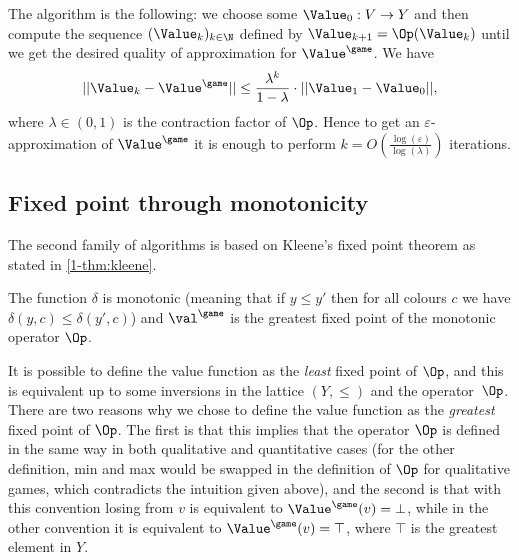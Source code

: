 The algorithm is the following:
we choose some $\Value_0 : V \to Y$ and then compute the sequence $(\Value_k)_{k \in \N}$ defined by $\Value_{k+1} = \Op(\Value_k)$
until we get the desired quality of approximation for $\Value^{\game}$.
We have
\[
||\Value_k - \Value^{\game}|| \le \frac{\lambda^k}{1 - \lambda} \cdot ||\Value_1 - \Value_0||,
\]
where $\lambda \in (0,1)$ is the contraction factor of $\Op$.
Hence to get an $\varepsilon$-approximation of $\Value^{\game}$ it is enough to perform 
$k = O \left( \frac{\log(\varepsilon)}{\log(\lambda)} \right)$ iterations.

\subsection*{Fixed point through monotonicity}
The second family of algorithms is based on Kleene's fixed point theorem as stated in \cref{1-thm:kleene}.

\begin{property}
\label{1-property:fixed_point_monotonicity}
The function $\delta$ is monotonic (meaning that if $y \le y'$ then for all colours $c$ we have $\delta(y,c) \le \delta(y',c)$)
and $\val^{\game}$ is the greatest fixed point of the monotonic operator $\Op$.
\end{property}

\begin{remark}
It is possible to define the value function as the \textit{least} fixed point of $\Op$, 
and this is equivalent up to some inversions in the lattice $(Y,\le)$ and the operator~$\Op$.
There are two reasons why we chose to define the value function as the \textit{greatest} fixed point of $\Op$.
The first is that this implies that the operator $\Op$ is defined in the same way in both qualitative and quantitative cases (for the other definition, min and max would be swapped in the definition of $\Op$ for qualitative games, which contradicts the intuition given above),
and the second is that with this convention losing from $v$ is equivalent to $\Value^{\game}(v) = \bot$,
while in the other convention it is equivalent to $\Value^{\game}(v) = \top$, where $\top$ is the greatest element in $Y$.
\end{remark}

